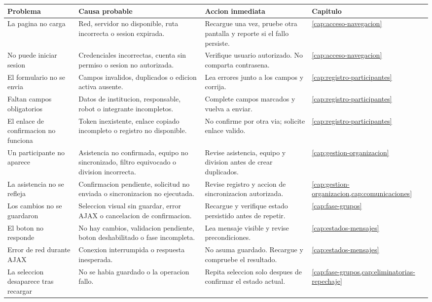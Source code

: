 \begin{longtable}{p{3.0cm}p{3.8cm}p{4.4cm}p{1.9cm}}
\toprule
Problema & Causa probable & Accion inmediata & Capitulo\\
\midrule
\endhead
La pagina no carga & Red, servidor no disponible, ruta incorrecta o sesion expirada. & Recargue una vez, pruebe otra pantalla y reporte si el fallo persiste. & \cref{cap:acceso-navegacion}\\
No puede iniciar sesion & Credenciales incorrectas, cuenta sin permiso o sesion no autorizada. & Verifique usuario autorizado. No comparta contrasena. & \cref{cap:acceso-navegacion}\\
El formulario no se envia & Campos invalidos, duplicados o edicion activa ausente. & Lea errores junto a los campos y corrija. & \cref{cap:registro-participantes}\\
Faltan campos obligatorios & Datos de institucion, responsable, robot o integrante incompletos. & Complete campos marcados y vuelva a enviar. & \cref{cap:registro-participantes}\\
El enlace de confirmacion no funciona & Token inexistente, enlace copiado incompleto o registro no disponible. & No confirme por otra via; solicite enlace valido. & \cref{cap:registro-participantes}\\
Un participante no aparece & Asistencia no confirmada, equipo no sincronizado, filtro equivocado o division incorrecta. & Revise asistencia, equipo y division antes de crear duplicados. & \cref{cap:gestion-organizacion}\\
La asistencia no se refleja & Confirmacion pendiente, solicitud no enviada o sincronizacion no ejecutada. & Revise registro y accion de sincronizacion autorizada. & \cref{cap:gestion-organizacion,cap:comunicaciones}\\
Los cambios no se guardaron & Seleccion visual sin guardar, error AJAX o cancelacion de confirmacion. & Recargue y verifique estado persistido antes de repetir. & \cref{cap:fase-grupos}\\
El boton no responde & No hay cambios, validacion pendiente, boton deshabilitado o fase incompleta. & Lea mensaje visible y revise precondiciones. & \cref{cap:estados-mensajes}\\
Error de red durante AJAX & Conexion interrumpida o respuesta inesperada. & No asuma guardado. Recargue y compruebe el resultado. & \cref{cap:estados-mensajes}\\
La seleccion desaparece tras recargar & No se habia guardado o la operacion fallo. & Repita seleccion solo despues de confirmar el estado actual. & \cref{cap:fase-grupos,cap:eliminatorias-repechaje}\\

\end{longtable}
